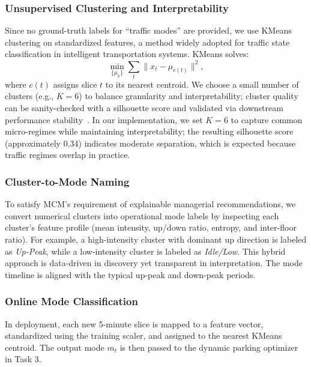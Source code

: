 \subsubsection{Unsupervised Clustering and Interpretability}
Since no ground-truth labels for ``traffic modes'' are provided, we use KMeans clustering on standardized features,  a method widely adopted for traffic state classification in intelligent transportation systems\cite{ZHAO201992}. KMeans solves:
\begin{equation}
\min_{\{\mu_k\}} \sum_{t} \|x_t - \mu_{c(t)}\|^2,
\end{equation}
where $c(t)$ assigns slice $t$ to its nearest centroid. We choose a small number of clusters (e.g., $K=6$) to balance granularity and interpretability; cluster quality can be sanity-checked with a silhouette score and validated via downstream performance stability~\cite{rousseeuw1987silhouette}. In our implementation, we set $K=6$ to capture common micro-regimes while maintaining interpretability; the resulting silhouette score (approximately 0.34) indicates moderate separation, which is expected because traffic regimes overlap in practice.

\subsubsection{Cluster-to-Mode Naming}
To satisfy MCM's requirement of explainable managerial recommendations, we convert numerical clusters into operational mode labels by inspecting each cluster's feature profile (mean intensity, up/down ratio, entropy, and inter-floor ratio). For example, a high-intensity cluster with dominant up direction is labeled as \emph{Up-Peak}, while a low-intensity cluster is labeled as \emph{Idle/Low}. This hybrid approach is data-driven in discovery yet transparent in interpretation. The mode timeline is aligned with the typical up-peak and down-peak periods.

% 


\subsubsection{Online Mode Classification}
In deployment, each new 5-minute slice is mapped to a feature vector, standardized using the training scaler, and assigned to the nearest KMeans centroid. The output mode $m_t$ is then passed to the dynamic parking optimizer in Task 3. 


